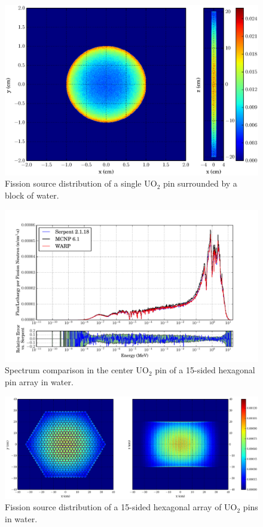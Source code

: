 \begin{figure}[h!]
\centering
\includegraphics[width=.75\textwidth]{graphics/finalresults/pincell_fiss-6.eps}
\caption{Fission source distribution of a single UO$_2$ pin surrounded by a block of water. \label{pincell_fiss} }
\end{figure}

\begin{figure}[h!] 
\centering
\includegraphics[width=\textwidth,trim= 1cm 0cm 1cm 0cm]{graphics/finalresults/assembly_spec-6.pdf}
\caption{Spectrum comparison in the center UO$_2$ pin of a 15-sided hexagonal pin array in water. \label{assembly_spec} }
\end{figure}

\begin{figure}[h!]
\centering
\includegraphics[width=\textwidth,trim= 4cm 0cm 6cm 0cm]{graphics/finalresults/assembly_fiss-6.eps}
\caption{Fission source distribution of a 15-sided hexagonal array of UO$_2$ pins in water. \label{assembly_fiss} }
\end{figure}
	

